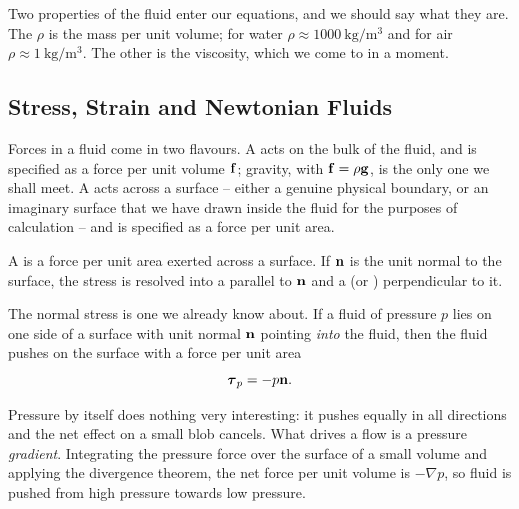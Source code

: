 \documentclass[a4paper]{scrartcl}
\begin{document}
Two properties of the fluid enter our equations, and we should say what they are. The  $\rho$ is the mass per unit volume; for water $\rho \approx \SI{1000}{\kilo\gram\per\meter\cubed}$ and for air $\rho \approx \SI{1}{\kilo\gram\per\meter\cubed}$. The other is the viscosity, which we come to in a moment.

\subsection{Stress, Strain and Newtonian Fluids}

Forces in a fluid come in two flavours. A  acts on the bulk of the fluid, and is specified as a force per unit volume $\mathbf{f}$; gravity, with $\mathbf{f} = \rho \mathbf{g}$, is the only one we shall meet. A  acts across a surface -- either a genuine physical boundary, or an imaginary surface that we have drawn inside the fluid for the purposes of calculation -- and is specified as a force per unit area.

\begin{definition}[Stress]
	A  is a force per unit area exerted across a surface. If $\mathbf{n}$ is the unit normal to the surface, the stress is resolved into a  parallel to $\mathbf{n}$ and a  (or )  perpendicular to it.
\end{definition}

The normal stress is one we already know about. If a fluid of pressure $p$ lies on one side of a surface with unit normal $\mathbf{n}$ pointing \emph{into} the fluid, then the fluid pushes on the surface with a force per unit area
$$
\boldsymbol\tau_p = - p \mathbf{n}.
$$

\begin{center}
\end{center}

Pressure by itself does nothing very interesting: it pushes equally in all directions and the net effect on a small blob cancels. What drives a flow is a pressure \emph{gradient}. Integrating the pressure force over the surface of a small volume and applying the divergence theorem, the net force per unit volume is $-\nabla p$, so fluid is pushed from high pressure towards low pressure.
\end{document}
